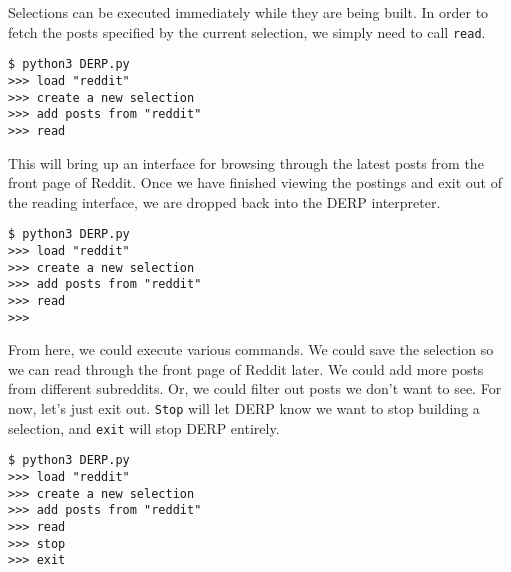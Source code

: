 Selections can be executed immediately while they are being built. In order to fetch the posts specified by the current selection, we simply need to call \texttt{read}.
\newline\begin{minipage}{\linewidth}\begin{lstlisting}
$ python3 DERP.py
>>> load "reddit"
>>> create a new selection
>>> add posts from "reddit"
>>> read
\end{lstlisting}\end{minipage}



This will bring up an interface for browsing through the latest posts from the front page of Reddit. Once we have finished viewing the postings and exit out of the reading interface, we are dropped back into the DERP interpreter.
\newline\begin{minipage}{\linewidth}\begin{lstlisting}
$ python3 DERP.py
>>> load "reddit"
>>> create a new selection
>>> add posts from "reddit"
>>> read
>>>
\end{lstlisting}\end{minipage}


From here, we could execute various commands. We could save the selection so we can read through the front page of Reddit later. We could add more posts from different subreddits. Or, we could filter out posts we don’t want to see. For now, let’s just exit out. \texttt{Stop} will let DERP know we want to stop building a selection, and \texttt{exit} will stop DERP entirely.
\newline\begin{minipage}{\linewidth}\begin{lstlisting}
$ python3 DERP.py
>>> load "reddit"
>>> create a new selection
>>> add posts from "reddit"
>>> read
>>> stop
>>> exit
\end{lstlisting}\end{minipage}
